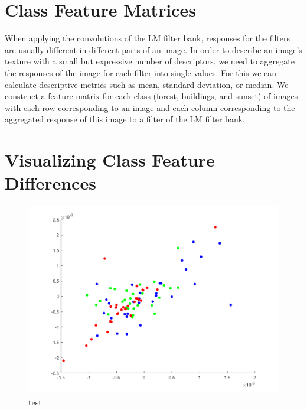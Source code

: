 \section{Class Feature Matrices}

When applying the convolutions of the LM filter bank, responses for the filters are usually different in different parts of an image. In order to describe an image's texture with a small but expressive number of descriptors, we need to aggregate the responses of the image for each filter into single values. For this we can calculate descriptive metrics such as mean, standard deviation, or median. We construct a feature matrix for each class (forest, buildings, and sunset) of images with each row corresponding to an image and each column corresponding to the aggregated response of this image to a filter of the LM filter bank.

\section{Visualizing Class Feature Differences}

\begin{figure}[!hbt]
  \includegraphics[width=\textwidth]{img/m41_m25}
    \caption{test}
  \label{fig:m41_m25}
\end{figure}


